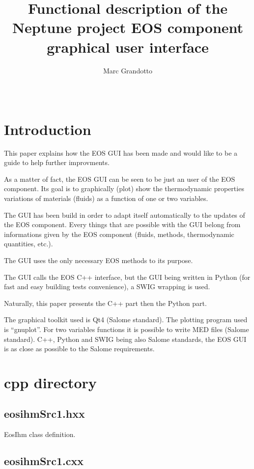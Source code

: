 \documentclass[10pt,a4paper]{article}
\title{Functional description of the Neptune project EOS component graphical user interface}
\author{Marc Grandotto}
\date{\ }
\begin{document}
\pagestyle{empty}

\maketitle

\tableofcontents

\newpage
\section{Introduction}

This paper explains how the EOS GUI has been made and would like to be a guide to help further improvments.

As a matter of fact, the EOS GUI can be seen to be just an user of the EOS component. Its goal is to graphically (plot) show the thermodynamic properties variations of materials (fluids) as a function of one or two variables.

The GUI has been build in order to adapt itself automatically to the updates of the EOS component. Every things that are possible with the GUI belong from informations given by the EOS component (fluids, methods, thermodynamic quantities, etc.).

The GUI uses the only necessary EOS methods to its purpose.

The GUI calls the EOS C++ interface, but the GUI being written in Python (for fast and easy building tests convenience), a SWIG wrapping is used.

Naturally, this paper presents the C++ part then the Python part.

The graphical toolkit used is Qt4 (Salome standard). The plotting program used is ``gnuplot''. For two variables functions it is possible to write MED files (Salome standard). C++, Python and SWIG being also Salome standards, the EOS GUI is as close as possible to the Salome requirements.

\section{cpp directory}

\subsection{eosihmSrc1.hxx}

EosIhm class definition.

\subsection{eosihmSrc1.cxx}
\end{document}
